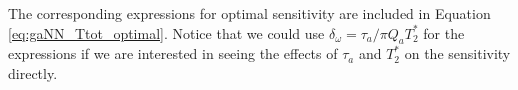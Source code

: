 \documentclass{WileyMSP-template}
\begin{document}
	The corresponding expressions for optimal sensitivity are included in Equation \eqref{eq:gaNN_Ttot_optimal}. 
	Notice that we could use $\delta_\omega = \tau_a/\pi Q_a T_2^*$ for the expressions if we are interested in seeing the effects of $\tau_a$ and $T_2^*$ on the sensitivity directly. 

	
	
	





\end{document}
